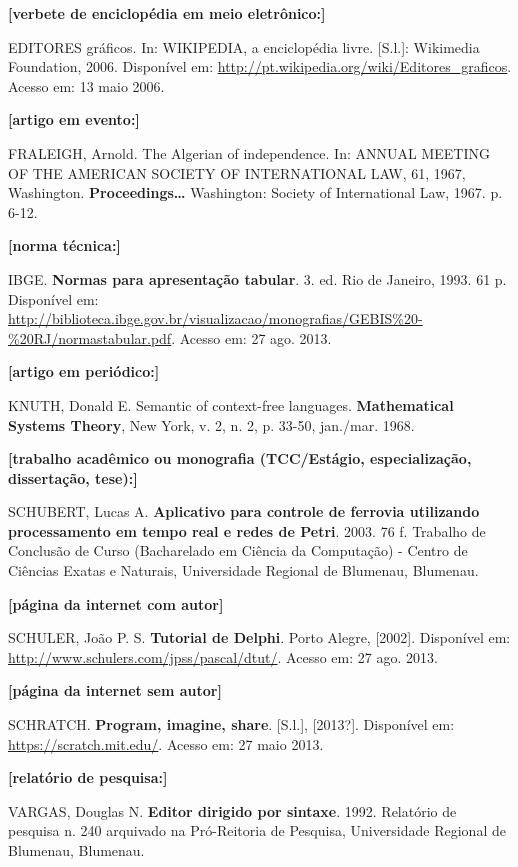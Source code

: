 \noindent\textbf{[verbete de enciclopédia em meio eletrônico:]}

EDITORES gráficos. In: WIKIPEDIA, a enciclopédia livre. [S.l.]:
Wikimedia Foundation, 2006. Disponível em:
\url{http://pt.wikipedia.org/wiki/Editores_graficos}. Acesso em: 13 maio
2006.

\noindent\textbf{[artigo em evento:]}

FRALEIGH, Arnold. The Algerian of independence. In: ANNUAL MEETING OF
THE AMERICAN SOCIETY OF INTERNATIONAL LAW, 61, 1967, Washington.
\textbf{Proceedings\ldots{}} Washington: Society of International Law,
1967. p. 6-12.

\noindent\textbf{[norma técnica:]}

IBGE. \textbf{Normas para apresentação tabular}. 3. ed. Rio de Janeiro,
1993. 61 p. Disponível em:
\url{http://biblioteca.ibge.gov.br/visualizacao/monografias/GEBIS%20-%20RJ/normastabular.pdf}.
Acesso em: 27 ago. 2013.

\noindent\textbf{[artigo em periódico:]}

KNUTH, Donald E. Semantic of context-free languages.
\textbf{Mathematical Systems Theory}, New York, v. 2, n. 2, p. 33-50,
jan./mar. 1968.

\noindent\textbf{[trabalho acadêmico ou monografia (TCC/Estágio, especialização, dissertação, tese):]}

SCHUBERT, Lucas A. \textbf{Aplicativo para controle de ferrovia
utilizando processamento em tempo real e redes de Petri}. 2003. 76 f.
Trabalho de Conclusão de Curso (Bacharelado em Ciência da Computação) -
Centro de Ciências Exatas e Naturais, Universidade Regional de Blumenau,
Blumenau.

\noindent\textbf{[página da internet com autor]}

SCHULER, João P. S. \textbf{Tutorial de Delphi}. Porto Alegre,
[2002]. Disponível em: \url{http://www.schulers.com/jpss/pascal/dtut/}.
Acesso em: 27 ago. 2013.

\noindent\textbf{[página da internet sem autor]}

SCHRATCH. \textbf{Program, imagine, share}. [S.l.], [2013?].
Disponível em: \url{https://scratch.mit.edu/}. Acesso em: 27 maio 2013.

\noindent\textbf{[relatório de pesquisa:]}

VARGAS, Douglas N. \textbf{Editor dirigido por sintaxe}. 1992. Relatório
de pesquisa n. 240 arquivado na Pró-Reitoria de Pesquisa, Universidade
Regional de Blumenau, Blumenau.
